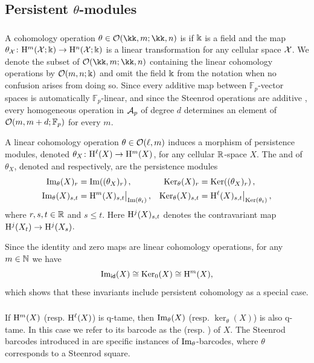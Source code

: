 
\subsection{Persistent $\theta$-modules}

\subsubsection{}\label{ss:theta-modules}

A cohomology operation $\theta \in \cO(\kk,m; \kk,n)$ is  if \(\Bbbk\) is a field and the map \(\theta_{\mathcal{X}} \colon \mathrm{H}^m(\mathcal{X}; \Bbbk) \to \mathrm{H}^n(\mathcal{X}; \Bbbk)\) is a linear transformation for any cellular space \(\mathcal{X}\).
We denote the subset of $\cO(\kk,m; \kk,n)$ containing the linear cohomology operations by $\mathcal{O}(m,n;\Bbbk)$ and omit the field \(\Bbbk\) from the notation when no confusion arises from doing so.
Since every additive map between \(\mathbb F_p\)-vector spaces is automatically \(\mathbb F_p\)-linear, and since the Steenrod operations are additive \cite[\S4.L]{hatcher2000}, every homogeneous operation in \(\mathcal{A}_p\) of degree \(d\) determines an element of \(\mathcal{O}(m,m+d;\mathbb F_p)\) for every \(m\).

A linear cohomology operation \(\theta \in \mathcal{O}(\ell, m)\) induces a morphism of persistence modules, denoted \(\theta_X \colon \mathrm{H}^\ell(X) \to \mathrm{H}^m(X)\), for any cellular \(\mathbb{R}\)-space \(X\).
The  and  of $\theta_X$, denoted  and  respectively, are the persistence modules
\begin{align*}
	\operatorname{Im}_\theta(X)_r &= \operatorname{Im}((\theta_X)_r)\,, &
	\operatorname{Ker}_\theta(X)_r &= \operatorname{Ker}((\theta_X)_r)\,, \\
	\operatorname{Im}_\theta(X)_{s,t} &= \mathrm{H}^m(X)_{s,t}\big|_{\operatorname{Im}(\theta_t)}\,, &
	\operatorname{Ker}_\theta(X)_{s,t} &= \mathrm{H}^\ell(X)_{s,t}\big|_{\operatorname{Ker}(\theta_t)}\,,
\end{align*}
where \(r, s, t \in \mathbb{R}\) and \(s \leq t\).
Here \(\mathrm{H}^j(X)_{s,t}\) denotes the contravariant map \(\mathrm{H}^j(X_t) \to \mathrm{H}^j(X_s)\).

Since the identity and zero maps are linear cohomology operations, for any \(m \in \mathbb{N}\) we have
\[
\operatorname{Im}_{\mathsf{id}}(X) \cong \operatorname{Ker}_0(X) \cong \mathrm{H}^m(X),
\]
which shows that these invariants include persistent cohomology as a special case.

\subsubsection{}\label{ss:theta-modules-q-tame}

If \(\mathrm{H}^m(X)\) (resp. \(\mathrm{H}^\ell(X)\)) is q-tame, then \(\operatorname{Im}_\theta(X)\) (resp. \(\ker_\theta(X)\)) is also q-tame.
In this case we refer to its barcode as the  (resp. ) of \(X\).
The Steenrod barcodes introduced in \cite{medina2022per_st} are specific instances of \(\operatorname{Im}_\theta\)-barcodes, where \(\theta\) corresponds to a Steenrod square.
